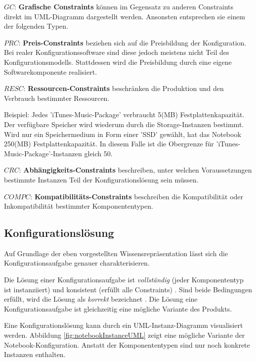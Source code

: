 \documentclass[11pt, a4paper, titlepage, listof=totoc, bibliography=totoc, index=totoc, twoside, openright, headings=normal]{scrreprt}
\begin{document}
\begin{compactitem}
\item[$GC$:] \textbf{Grafische Constraints} können im Gegensatz zu anderen Constraints direkt im UML-Diagramm dargestellt werden. Ansonsten entsprechen sie einem der folgenden Typen.
\item[$PRC$:] \textbf{Preis-Constraints} beziehen sich auf die Preisbildung der Konfiguration. Bei realer Konfigurationssoftware sind diese jedoch meistens nicht Teil des Konfigurationsmodells. Stattdessen wird die Preisbildung durch eine eigene Softwarekomponente realisiert.
\item[$RESC$:] \textbf{Ressourcen-Constraints} beschränken die Produktion und den Verbrauch bestimmter Ressourcen.\vspace{0.3em}

Beispiel: Jedes 'iTunes-Music-Package' verbraucht 5(MB) Festplattenkapazität. Der verfügbare Speicher wird wiederum durch die Storage-Instanzen bestimmt. Wird nur ein Speichermedium in Form einer 'SSD' gewählt, hat das Notebook 250(MB) Festplattenkapazität. In diesem Falle ist die Obergrenze für 'iTunes-Music-Package'-Instanzen gleich 50.
\item[$CRC$:] \textbf{Abhängigkeits-Constraints} beschreiben, unter welchen Voraussetzungen bestimmte Instanzen Teil der Konfigurationslösung sein müssen.
\item[$COMPC$:] \textbf{Kompatibilitäts-Constraints} beschreiben die Kompatibilität  oder Inkompatibilität bestimmter Komponententypen.
\end{compactitem}

\subsection{Konfigurationslösung}
\label{Konfigurationslösung}
Auf Grundlage der eben vorgestellten Wissensrepräsentation lässt sich die Konfigurationsaufgabe genauer charakterisieren.

Die Lösung einer Konfigurationsaufgabe ist \emph{vollständig} (jeder Komponententyp ist instanziiert) und konsistent (erfüllt alle Constraints) \citep[angelehnt an][]{falkner11}. Sind beide Bedingungen erfüllt, wird die Lösung als \emph{korrekt} bezeichnet \citep{soininen98}. Die Lösung eine Konfigurationsaufgabe ist gleichzeitig eine mögliche Variante des Produkts.

Eine Konfigurationslösung kann durch ein UML-Instanz-Diagramm visualisiert werden.  Abbildung \ref{fig:notebookInstanceUML} zeigt eine mögliche Variante der Notebook-Konfiguration. Anstatt der Komponententypen sind nur noch konkrete Instanzen enthalten.
\end{document}
